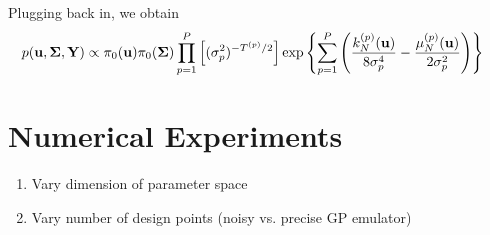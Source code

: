 \documentclass[12pt]{article}
\begin{document}
Plugging back in, we obtain 
\begin{align*}
p(\mathbf{u}, \boldsymbol{\Sigma}, \mathbf{Y}) 
&\propto \pi_0(\mathbf{u}) \pi_0(\boldsymbol{\Sigma}) \prod_{p=1}^{P} \left[(\sigma^2_{p})^{-{T}^{(p)}/2}\right]
\exp\left\{\sum_{p=1}^{P} \left(\frac{k_{N}^{(p)}(\mathbf{u})}{8\sigma^4_{p}} -
 \frac{\mu_{N}^{(p)}(\mathbf{u})}{2\sigma^2_{p}}\right) \right\}
\end{align*}


\section{Numerical Experiments}
\begin{enumerate}
\item Vary dimension of parameter space
\item Vary number of design points (noisy vs. precise GP emulator)
\end{enumerate}
\end{document}
